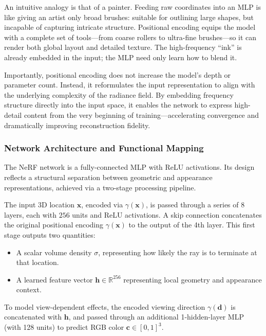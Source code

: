 An intuitive analogy is that of a painter. Feeding raw coordinates into an MLP is like giving an artist only broad brushes: suitable for outlining large shapes, but incapable of capturing intricate structure. Positional encoding equips the model with a complete set of tools—from coarse rollers to ultra-fine brushes—so it can render both global layout and detailed texture. The high-frequency “ink” is already embedded in the input; the MLP need only learn how to blend it.

Importantly, positional encoding does not increase the model's depth or parameter count. Instead, it reformulates the input representation to align with the underlying complexity of the radiance field. By embedding frequency structure directly into the input space, it enables the network to express high-detail content from the very beginning of training—accelerating convergence and dramatically improving reconstruction fidelity.

\newpage

\subsubsection{Network Architecture and Functional Mapping}
\label{subsec:chapter23_architecture}

The NeRF network is a fully-connected MLP with ReLU activations. Its design reflects a structural separation between geometric and appearance representations, achieved via a two-stage processing pipeline.

The input 3D location \( \mathbf{x} \), encoded via \( \gamma(\mathbf{x}) \), is passed through a series of \( 8 \) layers, each with \( 256 \) units and ReLU activations. A skip connection concatenates the original positional encoding \( \gamma(\mathbf{x}) \) to the output of the 4th layer. This first stage outputs two quantities:

\begin{itemize}
    \item A scalar volume density \( \sigma \), representing how likely the ray is to terminate at that location.
    \item A learned feature vector \( \mathbf{h} \in \mathbb{R}^{256} \) representing local geometry and appearance context.
\end{itemize}

To model view-dependent effects, the encoded viewing direction \( \gamma(\mathbf{d}) \) is concatenated with \( \mathbf{h} \), and passed through an additional 1-hidden-layer MLP (with 128 units) to predict RGB color \( \mathbf{c} \in [0,1]^3 \).

